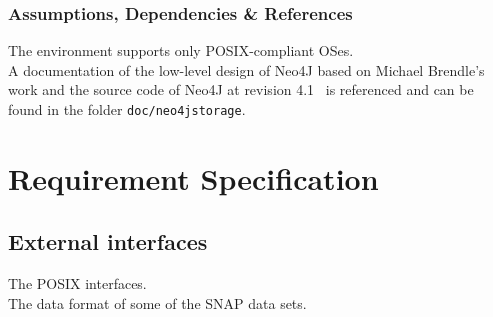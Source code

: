 	\subsubsection{Assumptions, Dependencies \& References}
		The environment supports only POSIX-compliant OSes. \\
		A documentation of the low-level design of Neo4J based on Michael Brendle's work and the source code of Neo4J at revision 4.1~\autocite{GitHubneo4j} is referenced and can be found in the folder \texttt{doc/neo4jstorage}.



\section{Requirement Specification}
	\subsection{External interfaces}
	The POSIX interfaces. \\
	The data format of some of the SNAP data sets. \\

